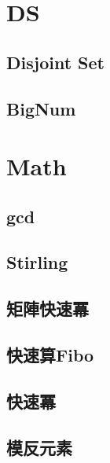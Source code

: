 \section{DS}

\subsection{Disjoint Set}


% 

\subsection{BigNum}


\section{Math}

\subsection{gcd}

\subsection{Stirling}


\subsection{矩陣快速冪}


\subsection{快速算Fibo}


\subsection{快速冪}


\subsection{模反元素}



